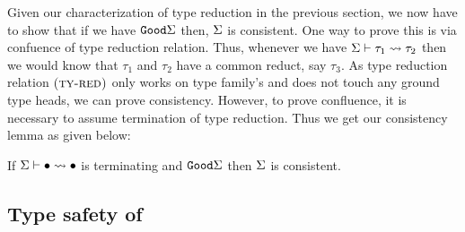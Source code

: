 \documentclass[format=sigplan,manuscript,review,screen,nonacm,margin=1in]{acmart}
\begin{document}
Given our characterization of type reduction in the previous section, we now have to show
that if we have $\texttt{Good}\Sigma$ then, $\Sigma$ is consistent. One way to prove this is
via confuence of type reduction relation. Thus, whenever we have $\Sigma \vdash \tau_1 \rightsquigarrow \tau_2$
then we would know that $\tau_1$ and $\tau_2$ have a common reduct, say $\tau_3$. As type reduction
relation $\textsc{(ty-red)}$ only works on type family's and does not touch any ground type heads,
we can prove consistency. However, to prove confluence, it is necessary to assume
termination of type reduction. Thus we get our consistency lemma as given below:
\begin{lemma}[Consistency]
  If $\Sigma \vdash \bullet \rightsquigarrow \bullet$ is terminating and $\texttt{Good}\Sigma$ then $\Sigma$ is consistent.
\end{lemma}

\subsection{Type safety of \CLTF{}}\label{subsec:tf-closed-safety}
\newcommand\SApp{
  \ib{\irule[\trule{s-app}]
    {\stepsto {\Tm_1} {\Tm'_1}};
    {\stepsto {\Tm_1\App\Tm_2} {\Tm'_1\App\Tm_2}}}
}
\newcommand\STApp{
  \ib{\irule[\trule{s-tapp}]
    {\stepsto {\Tm_1} {\Tm'_1}};
    {\stepsto {\Tm_1\App\tau} {\Tm'_1\App\tau}}}
}

\newcommand\SCApp{
  \ib{\irule[\trule{s-capp}]
    {\stepsto {\Tm_1} {\Tm'_1}};
    {\stepsto {\Tm_1\App\Co} {\Tm'_1\App\Co}}}
}

\newcommand\SCast{
  \ib{\irule[\trule{s-cast}]
    {\stepsto {\Tm_1} {\Tm'_1}};
    {\stepsto {\cast{\Tm_1}\Co} {\cast{\Tm'_1}\Co}}}
}

\newcommand\SBeta{
  \ib{\irule[\trule{s-$\beta$}];
    {\stepsto {(\Lam x \tau \Tm_1)\App\Tm_2} {\Tm_1[x/\Tm_2]}}
  }
}
\newcommand\STBeta{
  \ib{\irule[\trule{s-T$\beta$}];
    {\stepsto {(\TLam \alpha \Tm)\App\tau} {\Tm[\alpha/\tau]}}
  }
}

\newcommand\SPush{
  \ib{\irule[\trule{s-push}]
    {\Co_1 = \sym{\nth 0 \Co}}
    {\Co_2 = \nth 1 \Co};
    {\stepsto {(\cast {\Lam x \tau \Tm} \Co) \App \Tm_1} {\cast {(\Lam x \tau \Tm)\App(\cast{\Tm_1} {\Co_1})} {\Co_2}}}
  }
}
\newcommand\STPush{
  \ib{\irule[\trule{s-tpush}];
    {\stepsto {(\cast {\TLam \alpha \Tm} \Co) \App \tau} {\cast {(\TLam \alpha \Tm)\App\tau} {\Co@\tau}}}
  }
}
\newcommand\STrans{
  \ib{\irule[\trule{s-trans}];
    {\stepsto {\cast {(\cast \Tm \Co)} \MoreCo} {\cast \Tm {\comp\Co\MoreCo}}}
  }
  
}
\end{document}
